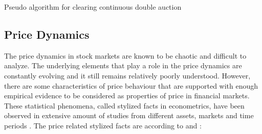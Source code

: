 \begin{algorithm}[H]
    \SetAlgoLined
    \DontPrintSemicolon

    \caption{Pseudo algorithm for clearing continuous double auction}
    \label{alg:lob_cont}
\end{algorithm}



\subsection{Price Dynamics}
The price dynamics in stock markets are known to be chaotic and difficult to 
analyze. The underlying elements that play a role in the price dynamics
are constantly evolving and it still remains relatively poorly understood.
However, there are some characteristics of price behaviour that are supported
with enough empirical evidence to be considered as properties of price in
financial markets. These statistical phenomena, called stylized facts in
econometrics, have been observed in extensive amount of studies from 
different assets, markets and time periods \citep{Shakeel18}. 
The price related stylized facts are according to \citet{StylizedFacts01} and \citet{lob13}:

